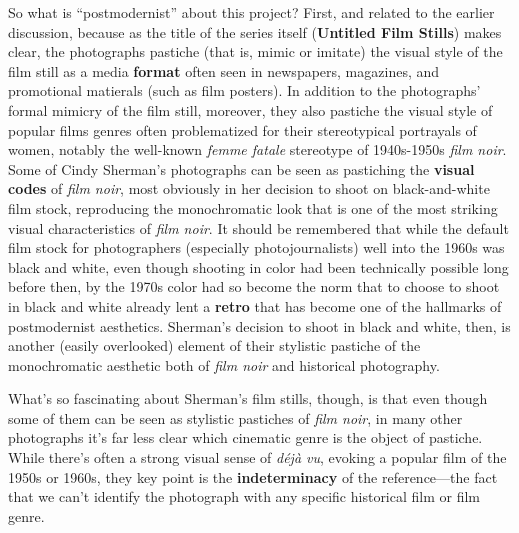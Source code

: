 \documentclass[
  letterpaper,
  DIV=11,
  numbers=noendperiod,
  oneside]{scrartcl}
\begin{document}
So what is ``postmodernist'' about this project? First, and related to
the earlier discussion, because as the title of the series itself
(\textbf{Untitled Film Stills}) makes clear, the photographs pastiche
(that is, mimic or imitate) the visual style of the film still as a
media \textbf{format} often seen in newspapers, magazines, and
promotional matierals (such as film posters). In addition to the
photographs' formal mimicry of the film still, moreover, they also
pastiche the visual style of popular films genres often problematized
for their stereotypical portrayals of women, notably the well-known
\emph{femme fatale} stereotype of 1940s-1950s \emph{film noir}. Some of
Cindy Sherman's photographs can be seen as pastiching the \textbf{visual
codes} of \emph{film noir}, most obviously in her decision to shoot on
black-and-white film stock, reproducing the monochromatic look that is
one of the most striking visual characteristics of \emph{film noir}. It
should be remembered that while the default film stock for photographers
(especially photojournalists) well into the 1960s was black and white,
even though shooting in color had been technically possible long before
then, by the 1970s color had so become the norm that to choose to shoot
in black and white already lent a \textbf{retro} that has become one of
the hallmarks of postmodernist aesthetics. Sherman's decision to shoot
in black and white, then, is another (easily overlooked) element of
their stylistic pastiche of the monochromatic aesthetic both of
\emph{film noir} and historical photography.

What's so fascinating about Sherman's film stills, though, is that even
though some of them can be seen as stylistic pastiches of \emph{film
noir}, in many other photographs it's far less clear which cinematic
genre is the object of pastiche. While there's often a strong visual
sense of \emph{déjà vu}, evoking a popular film of the 1950s or 1960s,
they key point is the \textbf{indeterminacy} of the reference---the fact
that we can't identify the photograph with any specific historical film
or film genre.
\end{document}
